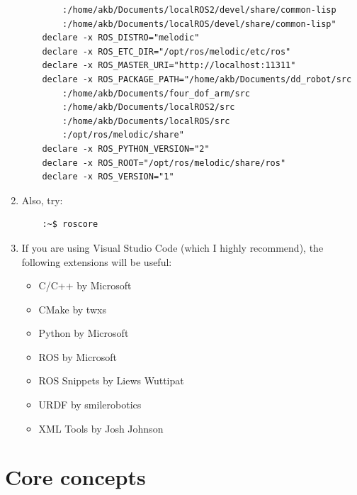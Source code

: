 \documentclass{article}
\begin{document}
\begin{enumerate}
\begin{verbatim}
        :/home/akb/Documents/localROS2/devel/share/common-lisp
        :/home/akb/Documents/localROS/devel/share/common-lisp"
    declare -x ROS_DISTRO="melodic"
    declare -x ROS_ETC_DIR="/opt/ros/melodic/etc/ros"
    declare -x ROS_MASTER_URI="http://localhost:11311"
    declare -x ROS_PACKAGE_PATH="/home/akb/Documents/dd_robot/src
        :/home/akb/Documents/four_dof_arm/src
        :/home/akb/Documents/localROS2/src
        :/home/akb/Documents/localROS/src
        :/opt/ros/melodic/share"
    declare -x ROS_PYTHON_VERSION="2"
    declare -x ROS_ROOT="/opt/ros/melodic/share/ros"
    declare -x ROS_VERSION="1"
            \end{verbatim}
            \item Also, try:
            \begin{verbatim}
    :~$ roscore
            \end{verbatim}

            \item If you are using Visual Studio Code (which I highly recommend),
            the following extensions will be useful:
            \begin{itemize}
                \item C/C++ by Microsoft
                \item CMake by twxs 
                \item Python by Microsoft
                \item ROS by Microsoft
                \item ROS Snippets by Liews Wuttipat
                \item URDF by smilerobotics
                \item XML Tools by Josh Johnson 
            \end{itemize}
        \end{enumerate}
    \section{Core concepts}
\end{document}
